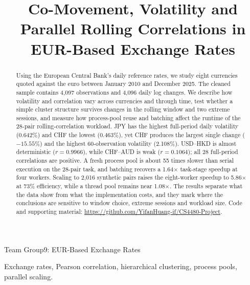 \documentclass[journal]{IEEEtran}
\begin{document}
\title{Co-Movement, Volatility and Parallel Rolling Correlations in EUR-Based Exchange Rates}

\author{

    \vspace{0.6em}

}

%
{Team Group9: EUR-Based Exchange Rates}

\maketitle

\begin{abstract}
Using the European Central Bank's daily reference rates, we study eight currencies quoted against the euro between January 2010 and December 2025. The cleaned sample contains 4,097 observations and 4,096 daily log changes. We describe how volatility and correlation vary across currencies and through time, test whether a simple cluster structure survives changes in the rolling window and two extreme sessions, and measure how process-pool reuse and batching affect the runtime of the 28-pair rolling-correlation workload. JPY has the highest full-period daily volatility (0.642\%) and CHF the lowest (0.463\%), yet CHF produces the largest single change ($-15.55\%$) and the highest 60-observation volatility (2.108\%). USD--HKD is almost deterministic ($r = 0.9966$), while CHF--AUD is weak ($r = 0.1064$); all 28 full-period correlations are positive. A fresh process pool is about 55 times slower than serial execution on the 28-pair task, and batching recovers a 1.64$\times$ task-stage speedup at four workers. Scaling to 2,016 synthetic pairs raises the eight-worker speedup to 5.86$\times$ at 73\% efficiency, while a thread pool remains near 1.08$\times$. The results separate what the data show from what the implementation costs, and they mark where the conclusions are sensitive to window choice, extreme sessions and workload size. Code and supporting material: \url{https://github.com/YifanHuang-if/CS4480-Project}.
\end{abstract}

\begin{IEEEkeywords}
Exchange rates, Pearson correlation, hierarchical clustering, process pools, parallel scaling.
\end{IEEEkeywords}
\end{document}
